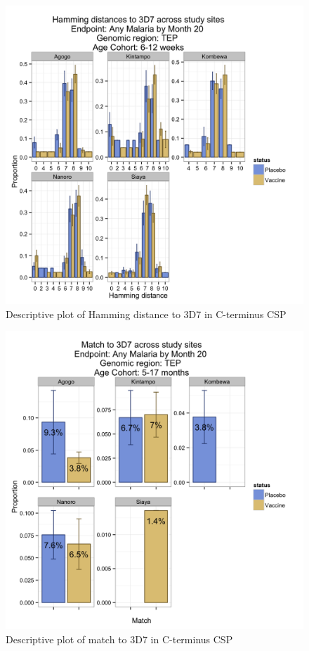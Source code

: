 \documentclass[]{article}
\begin{document}
\begin{figure}[htbp]
\centering
\includegraphics{figures/hamming-newborn-sites-x-1.png}
\caption{Descriptive plot of Hamming distance to 3D7 in C-terminus CSP}
\end{figure}

\begin{figure}[htbp]
\centering
\includegraphics{figures/match-infant-sites-x-1.png}
\caption{Descriptive plot of match to 3D7 in C-terminus CSP}
\end{figure}
\end{document}
